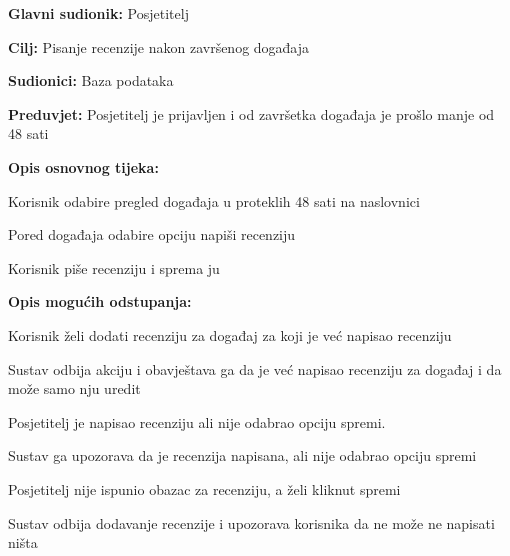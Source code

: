 				\noindent {}
				\begin{packed_item}
					
					\item \textbf{Glavni sudionik: }Posjetitelj
					\item  \textbf{Cilj:} Pisanje recenzije nakon završenog događaja
					\item  \textbf{Sudionici:} Baza podataka
					\item  \textbf{Preduvjet:} Posjetitelj je prijavljen i od završetka događaja je prošlo manje od 48 sati
					\item  \textbf{Opis osnovnog tijeka:}
					
					\item[] \begin{packed_enum}
						
						\item Korisnik odabire pregled događaja u proteklih 48 sati na naslovnici
						\item Pored događaja odabire opciju napiši recenziju
						\item Korisnik piše recenziju i sprema ju
					\end{packed_enum}
					
					\item  \textbf{Opis mogućih odstupanja:}
					
					\item[] \begin{packed_item}
						
						\item[2.a] Korisnik želi dodati recenziju za događaj za koji je već napisao recenziju
						\item[] \begin{packed_enum}
							\item Sustav odbija akciju i obavještava ga da je već napisao recenziju za događaj i da može samo nju uredit
						\end{packed_enum} 
						
						\item[3.a] Posjetitelj je napisao  recenziju ali nije odabrao opciju spremi.
						\item[] \begin{packed_enum}
							\item Sustav ga upozorava da je recenzija napisana, ali nije odabrao opciju spremi
						\end{packed_enum}
						
						\item[3.b] Posjetitelj nije ispunio obazac za recenziju, a želi kliknut spremi 
						\item[] \begin{packed_enum}
							\item Sustav odbija dodavanje recenzije i upozorava korisnika da ne može ne napisati ništa
						\end{packed_enum}
					\end{packed_item}
				\end{packed_item}
				
